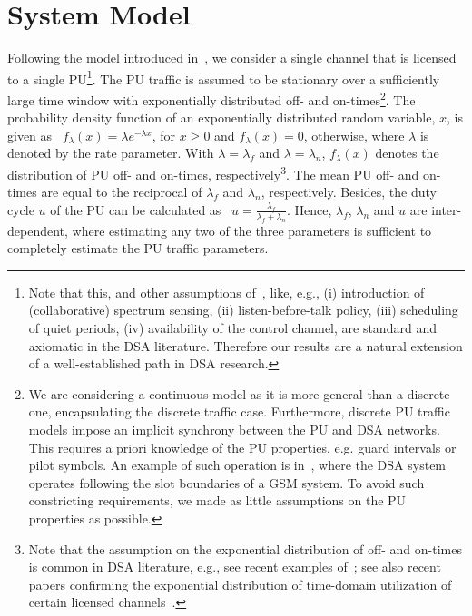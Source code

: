 \documentclass[11pt,draftclsnofoot,journal,onecolumn]{IEEEtran}
\begin{document}
\section{System Model}
\label{sec:System_Model}

Following the model introduced in~\cite{kim_tmc_2008}, we consider a single channel that is licensed to a single PU\footnote{Note that this, and other assumptions of~\cite{kim_tmc_2008}, like, e.g., (i) introduction of (collaborative) spectrum sensing, (ii) listen-before-talk policy, (iii) scheduling of quiet periods, (iv) availability of the control channel, are standard and axiomatic in the DSA literature. Therefore our results are a natural extension of a well-established path in DSA research.}. The PU traffic is assumed to be stationary over a sufficiently large time window with exponentially distributed off- and on-times\footnote{We are considering a continuous model as it is more general than a discrete one, encapsulating the discrete traffic case. Furthermore, discrete PU traffic models impose an implicit synchrony between the PU and DSA networks. This requires a priori knowledge of the PU properties, e.g. guard intervals or pilot symbols. An example of such operation is in~\cite{Papadimitratos_commag_2005}, where the DSA system operates following the slot boundaries of a GSM system. To avoid such constricting requirements, we made as little assumptions on the PU properties as possible.}. The probability density function of an exponentially distributed random variable, $x$, is given as~\cite[Eq. (3.15)]{vanmieghem_book_2006} $f_{\lambda}(x)=\lambda e^{-\lambda x}$, for $x\geq 0$ and $f_{\lambda}(x)=0$, otherwise, where $\lambda$ is denoted by the rate parameter. With $\lambda=\lambda_f$ and $\lambda=\lambda_n$, $f_{\lambda}(x)$ denotes the distribution of PU off- and on-times, respectively\footnote{Note that the assumption on the exponential distribution of off- and on-times is common in DSA literature, e.g., see recent examples of~\cite{li_jsac_2011,alshamrani_jsac_2011,zhang_jsac_2011}; see also recent papers confirming the exponential distribution of time-domain utilization of certain licensed channels~\cite{wellens_phycom_2009,chen_mobicom_2009,yin_tmcsub_2010}.}. The mean PU off- and on-times are equal to the reciprocal of $\lambda_f$ and $\lambda_n$, respectively. Besides, the duty cycle $u$ of the PU can be calculated as~\cite[Sec. 11.3]{vanmieghem_book_2006} $u =\frac{\lambda_f}{\lambda_f+\lambda_n}$. Hence, $\lambda_f$, $\lambda_n$ and $u$ are inter-dependent, where estimating any two of the three parameters is sufficient to completely estimate the PU traffic parameters.
\end{document}
